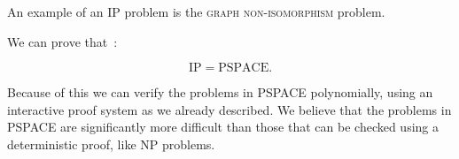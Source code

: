 An example of an IP problem is the \textsc{graph non-isomorphism} problem.

We can prove that~\cite{ipequalspspace}:
\begin{theorem}
    \begin{equation}
 \text{IP} = \text{PSPACE}.
    \end{equation}
\end{theorem}

Because of this we can verify the problems in PSPACE polynomially, using an interactive proof system as we already described.
We believe that the problems in PSPACE are significantly more difficult than those that can be checked using a deterministic proof, like NP problems.


